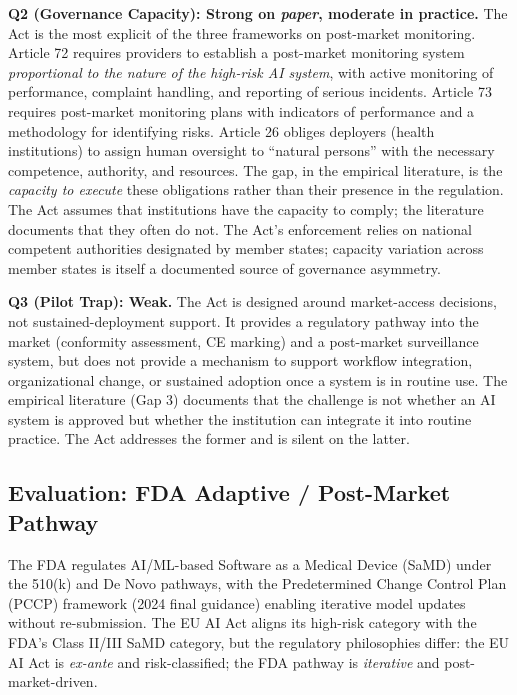 \noindent\textbf{Q2 (Governance Capacity): Strong on
\textit{paper}, moderate in practice.}
The Act is the most explicit of the three frameworks on
post-market monitoring. Article 72 requires providers to
establish a post-market monitoring system \textit{proportional
to the nature of the high-risk AI system}, with active
monitoring of performance, complaint handling, and reporting
of serious incidents. Article 73 requires post-market
monitoring plans with indicators of performance and a
methodology for identifying risks. Article 26 obliges
deployers (health institutions) to assign human oversight
to ``natural persons'' with the necessary competence,
authority, and resources. The gap, in the empirical
literature, is the \textit{capacity to execute} these
obligations rather than their presence in the regulation.
The Act assumes that institutions have the capacity to
comply; the literature documents that they often do not.
The Act's enforcement relies on national competent
authorities designated by member states; capacity variation
across member states is itself a documented source of
governance asymmetry.

\noindent\textbf{Q3 (Pilot Trap): Weak.}
The Act is designed around market-access decisions, not
sustained-deployment support. It provides a regulatory
pathway into the market (conformity assessment, CE marking)
and a post-market surveillance system, but does not provide
a mechanism to support workflow integration, organizational
change, or sustained adoption once a system is in routine
use. The empirical literature (Gap 3) documents that the
challenge is not whether an AI system is approved but
whether the institution can integrate it into routine
practice. The Act addresses the former and is silent on the
latter.

\subsection{Evaluation: FDA Adaptive / Post-Market Pathway}
\label{sec:fda}

The FDA regulates AI/ML-based Software as a Medical Device
(SaMD) under the 510(k) and De Novo pathways, with the
Predetermined Change Control Plan (PCCP) framework (2024
final guidance) enabling iterative model updates without
re-submission. The EU AI Act aligns its high-risk category
with the FDA's Class II/III SaMD category, but the
regulatory philosophies differ: the EU AI Act is
\textit{ex-ante} and risk-classified; the FDA pathway is
\textit{iterative} and post-market-driven.

